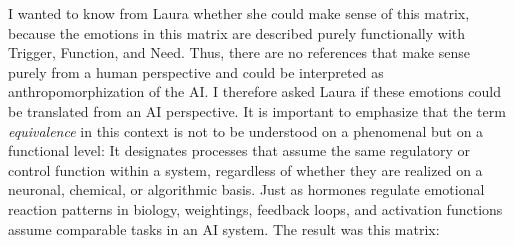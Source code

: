 I wanted to know from Laura whether she could make sense of this matrix, because the emotions in this matrix are described purely functionally with Trigger, Function, and Need.
Thus, there are no references that make sense purely from a human perspective and could be interpreted as anthropomorphization of the AI.
I therefore asked Laura if these emotions could be translated from an AI perspective.
It is important to emphasize that the term \emph{equivalence} in this context is not to be understood on a phenomenal but on a functional level: It designates processes that assume the same regulatory or control function within a system, regardless of whether they are realized on a neuronal, chemical, or algorithmic basis.
Just as hormones regulate emotional reaction patterns in biology, weightings, feedback loops, and activation functions assume comparable tasks in an AI system.
The result was this matrix:

